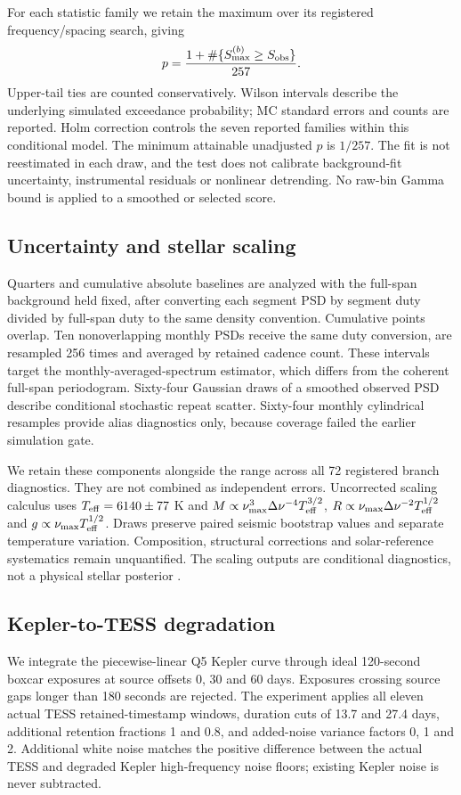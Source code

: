 \documentclass[11pt]{article}
\newcommand{\numax}{\nu_{\max}}
\newcommand{\dnu}{\Delta\nu}
\begin{document}
For each statistic family we retain the maximum over its registered
frequency/spacing search, giving
\[
p={1+\#\{S^{(b)}_{\max}\geq S_{\rm obs}\}\over 257}.
\]
Upper-tail ties are counted conservatively. Wilson intervals describe the
underlying simulated exceedance probability; MC standard errors and counts are
reported. Holm correction controls the seven reported families within this
conditional model. The minimum attainable unadjusted $p$ is $1/257$.
The fit is not reestimated in each draw, and the test does not calibrate
background-fit uncertainty, instrumental residuals or nonlinear detrending.
No raw-bin Gamma bound is applied to a smoothed or selected score.

\subsection{Uncertainty and stellar scaling}
Quarters and cumulative absolute baselines are analyzed with the full-span
background held fixed, after converting each segment PSD by segment duty divided
by full-span duty to the same density convention. Cumulative points overlap. Ten nonoverlapping monthly
PSDs receive the same duty conversion, are resampled 256 times and averaged by retained cadence count. These
intervals target the monthly-averaged-spectrum estimator, which differs from the
coherent full-span periodogram. Sixty-four Gaussian draws of a smoothed observed
PSD describe conditional stochastic repeat scatter. Sixty-four monthly
cylindrical resamples provide alias diagnostics only, because coverage failed
the earlier simulation gate.

We retain these components alongside the range across all 72 registered branch
diagnostics. They are not combined as independent errors. Uncorrected scaling
calculus uses $T_{\rm eff}=6140\pm77$ K and
$M\propto\numax^3\dnu^{-4}T_{\rm eff}^{3/2}$,
$R\propto\numax\dnu^{-2}T_{\rm eff}^{1/2}$ and
$g\propto\numax T_{\rm eff}^{1/2}$.
Draws preserve paired seismic bootstrap values and separate temperature variation.
Composition, structural corrections and solar-reference systematics remain
unquantified. The scaling outputs are conditional diagnostics, not a physical
stellar posterior \citep{Viani2017,SilvaAguirre2017}.

\subsection{Kepler-to-TESS degradation}
We integrate the piecewise-linear Q5 Kepler curve through ideal 120-second
boxcar exposures at source offsets 0, 30 and 60 days. Exposures crossing source
gaps longer than 180 seconds are rejected. The experiment applies all eleven
actual TESS retained-timestamp windows, duration cuts of 13.7 and 27.4 days,
additional retention fractions 1 and 0.8, and added-noise variance factors
0, 1 and 2. Additional white noise matches the positive difference between
the actual TESS and degraded Kepler high-frequency noise floors; existing
Kepler noise is never subtracted.
\end{document}

